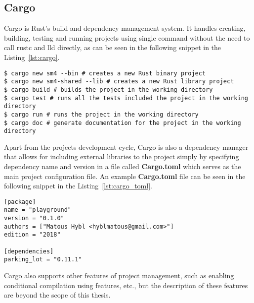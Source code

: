 \newpage
\subsection{Cargo}
\label{subsec:cargo}
Cargo is Rust's build and dependency management system.
It handles creating, building, testing and running projects using single command without the need to call rustc and lld directly, as can be seen in the following snippet in the Listing~\ref{lst:cargo}.

\begin{lstlisting}[caption={Using cargo for project development cycle.},label=lst:cargo]
$ cargo new sm4 --bin # creates a new Rust binary project
$ cargo new sm4-shared --lib # creates a new Rust library project
$ cargo build # builds the project in the working directory
$ cargo test # runs all the tests included the project in the working directory
$ cargo run # runs the project in the working directory
$ cargo doc # generate documentation for the project in the working directory
\end{lstlisting}

Apart from the projects development cycle, Cargo is also a dependency manager that allows for including external libraries to the project simply by specifying dependency name and version in a file called \textbf{Cargo.toml} which serves as the main project configuration file.
An example \textbf{Cargo.toml} file can be seen in the following snippet in the Listing~\ref{lst:cargo_toml}.

\begin{lstlisting}[caption={An example Cargo.toml file containing project definition.},label=lst:cargo_toml]
[package]
name = "playground"
version = "0.1.0"
authors = ["Matous Hybl <hyblmatous@gmail.com>"]
edition = "2018"

[dependencies]
parking_lot = "0.11.1"
\end{lstlisting}

Cargo also supports other features of project management, such as enabling conditional compilation using features, etc., but the description of these features are beyond the scope of this thesis.